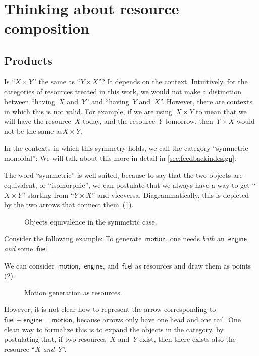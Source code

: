 \section{Thinking about resource composition}
\label{sec:productset}
\subsection{Products}
Is ``$X \times Y$'' the same as ``$Y \times X$''?
It depends on the context. Intuitively, for the categories of resources treated in this work, we would not make a distinction between ``having~$X$ and~$Y$'' and ``having~$Y$ and~$X$''.
However, there are contexts in which this is not valid. For example, if we are
using~$X \times Y$ to mean that we will have the resource~$X$ today, and the
resource~$Y$ tomorrow, then~$Y \times X$ would not be the same as$X \times Y$. 

In the contexts in which this symmetry holds, we call the category ``symmetric monoidal'': We will talk about this more in detail in \cref{sec:feedbackindesign}.

The word ``symmetric'' is well-suited, because to say that the two objects are equivalent, or ``isomorphic'', we can postulate that we always have a way to get
``$X \times Y$'' starting from ``$Y \times X$'' and viceversa. Diagrammatically, this is depicted by the two arrows that connect them~(\cref{fig:e17}).

\begin{figure}[h!]
    \centering
    \caption{Objects equivalence in the symmetric case. \label{fig:e17}}
\end{figure}

Consider the following example: To generate~$\mathsf{motion}$, one needs \emph{both} an~$\mathsf{engine}$ \emph{and} some~$\mathsf{fuel}$.

We can consider~$\mathsf{motion}$,~$\mathsf{engine}$, and~$\mathsf{fuel}$ as resources and draw them as points (\cref{fig:e11}).

\begin{figure}[h!]
    \centering
    \caption{Motion generation as resources. \label{fig:e11}}
\end{figure}

However, it is not clear how to represent the arrow corresponding to~$\mathsf{fuel} + \mathsf{engine} = \mathsf{motion}$, because arrows only have one head and one tail.
One clean way to formalize this is to expand the objects in the category, by postulating that, if two resources~$X$ and~$Y$ exist, then there exists also the resource ``$X$ \emph{and}~$Y$''.

